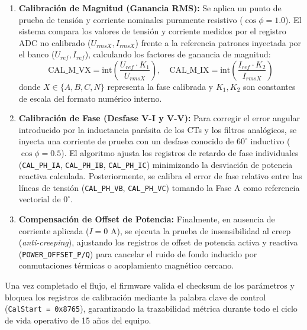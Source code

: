 \begin{enumerate}
    \item \textbf{Calibración de Magnitud (Ganancia RMS):} Se aplica un punto de prueba de tensión y corriente nominales puramente resistivo ($\cos\phi = 1.0$). El sistema compara los valores de tensión y corriente medidos por el registro ADC no calibrado ($U_{rmsX}, I_{rmsX}$) frente a la referencia patrones inyectada por el banco ($U_{ref}, I_{ref}$), calculando los factores de ganancia de magnitud:
    \begin{equation}
        \text{CAL\_M\_VX} = \text{int} \left( \frac{U_{ref} \cdot K_1}{U_{rmsX}} \right), \quad \text{CAL\_M\_IX} = \text{int} \left( \frac{I_{ref} \cdot K_2}{I_{rmsX}} \right)
    \end{equation}
    donde $X \in \{A, B, C, N\}$ representa la fase calibrada y $K_1, K_2$ son constantes de escala del formato numérico interno.

    \item \textbf{Calibración de Fase (Desfase V-I y V-V):} Para corregir el error angular introducido por la inductancia parásita de los CTs y los filtros analógicos, se inyecta una corriente de prueba con un desfase conocido de $60^\circ$ inductivo ($\cos\phi = 0.5$). El algoritmo ajusta los registros de retardo de fase individuales (\texttt{CAL\_PH\_IA}, \texttt{CAL\_PH\_IB}, \texttt{CAL\_PH\_IC}) minimizando la desviación de potencia reactiva calculada. Posteriormente, se calibra el error de fase relativo entre las líneas de tensión (\texttt{CAL\_PH\_VB}, \texttt{CAL\_PH\_VC}) tomando la Fase A como referencia vectorial de $0^\circ$.

    \item \textbf{Compensación de Offset de Potencia:} Finalmente, en ausencia de corriente aplicada ($I = 0\text{ A}$), se ejecuta la prueba de insensibilidad al creep (\textit{anti-creeping}), ajustando los registros de offset de potencia activa y reactiva (\texttt{POWER\_OFFSET\_P/Q}) para cancelar el ruido de fondo inducido por conmutaciones térmicas o acoplamiento magnético cercano.
\end{enumerate}

Una vez completado el flujo, el firmware valida el checksum de los parámetros y bloquea los registros de calibración mediante la palabra clave de control (\texttt{CalStart = 0x8765}), garantizando la trazabilidad métrica durante todo el ciclo de vida operativo de 15 años del equipo.


